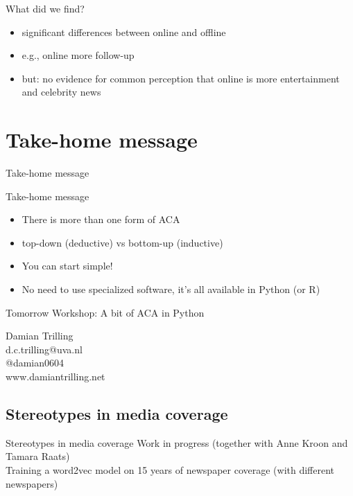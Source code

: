 \documentclass{beamer}
\begin{document}
\begin{frame}{What did we find?}
	\begin{itemize}
	\item significant differences between online and offline
	\item e.g., online more follow-up
	\item but: no evidence for common perception that online is more entertainment and celebrity news
	\end{itemize}
\end{frame}




\section{Take-home message}
\begin{frame}
	Take-home message
\end{frame}

\begin{frame}{Take-home message}
\begin{itemize}
	\item There is more than one form of ACA
	\item top-down (deductive) vs bottom-up (inductive)
	\item You can start simple!
	\item No need to use specialized software, it's all available in Python (or R)
\end{itemize}
\end{frame}


\begin{frame}{Tomorrow}
	Workshop: A bit of ACA in Python
\end{frame}

\begin{frame}[plain]
	\huge
	\centering
	Damian Trilling\\ \vspace{0.5cm}
	d.c.trilling@uva.nl\\
	@damian0604\\
	www.damiantrilling.net\\
\end{frame}



\subsection{Stereotypes in media coverage}
\begin{frame}{Stereotypes in media coverage}
Work in progress (together with Anne Kroon and Tamara Raats)
\\
Training a word2vec model on 15 years of newspaper coverage (with different newspapers)

\end{frame}
\end{document}
